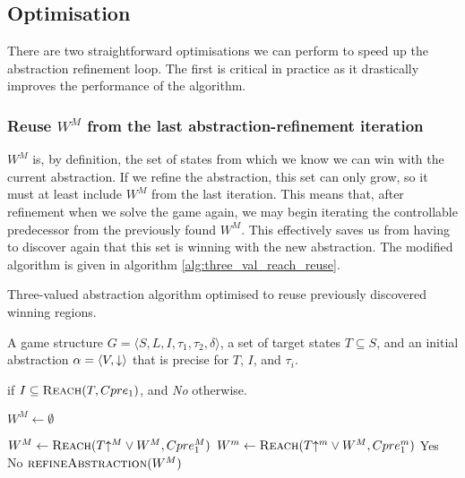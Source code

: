 \subsection{Optimisation}

There are two straightforward optimisations we can perform to speed up the abstraction refinement loop. The first is critical in practice as it drastically improves the performance of the algorithm.

\subsubsection{Reuse $W^M$ from the last abstraction-refinement iteration}

$W^M$ is, by definition, the set of states from which we know we can win with the current abstraction. If we refine the abstraction, this set can only grow, so it must at least include $W^M$ from the last iteration. This means that, after refinement when we solve the game again, we may begin iterating the controllable predecessor from the previously found $W^M$. This effectively saves us from having to discover again that this set is winning with the new abstraction. The modified algorithm is given in algorithm \ref{alg:three_val_reach_reuse}.

\begin{algorithm}
\caption{Three-valued abstraction algorithm optimised to reuse previously discovered winning regions.}
\label{alg:three_val_reach_reuse}

\begin{algorithmic}[1]

\Require A game structure $G = \langle S, L, I, \tau_1, \tau_2, \delta \rangle$, a set 
of target states $T\subseteq S$, and an initial abstraction $\alpha=\langle V, \mathord{\downarrow} \rangle$
that is precise for $T$, $I$, and $\tau_i$.

 if $I \subseteq \textsc{Reach}(T, Cpre_1)$, and {\it No} otherwise.


    \State $W^M \gets \emptyset$

    \Loop
        \State $W^M \gets \textsc{Reach}(T\mathord{\uparrow^M} \vee W^M, Cpre_1^M)$
        \State $W^m \gets \textsc{Reach}(T\mathord{\uparrow^m} \vee W^M, Cpre_1^m)$
            \State\Return Yes
            \State\Return No
        \Else       
            \State$\Call{refineAbstraction}{W^M}$
        \EndIf
    \EndLoop
\EndFunction

\end{algorithmic}
\end{algorithm}


